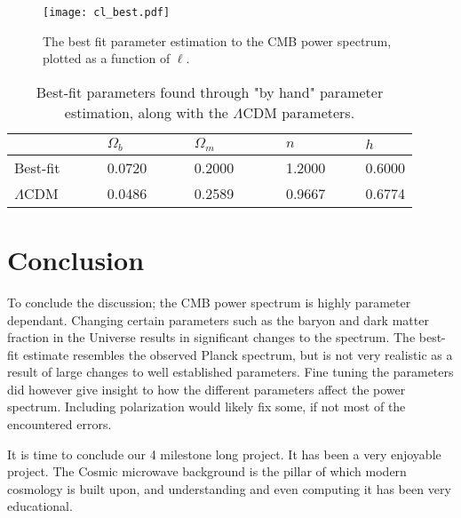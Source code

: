 \documentclass[a4paper, 10pt, reqno]{amsart}
\begin{document}
\begin{figure}
    \centering
    \texttt{[image: cl\_best.pdf]}
    \caption{The best fit parameter estimation to the CMB power spectrum, plotted as a function of $\ell$. }
    \label{fig: best}
\end{figure}

\begin{table}
\caption{Best-fit parameters found through "by hand" parameter estimation, along with the $\Lambda$CDM parameters.}
\label{tab: best}
\begin{tabular}{lllll}
\hline
\hline
&$\Omega_b \qquad\qquad$ & $\Omega_m \qquad\qquad$ & $n \qquad\qquad$ & $h$ \\ \hline
Best-fit $\qquad$&0.0720      & 0.2000        & 1.2000 & 0.6000 \\
$\Lambda$CDM $\qquad$& 0.0486 & 0.2589 & 0.9667 & 0.6774\\
\hline
\end{tabular}
\end{table}

\section{Conclusion}
To conclude the discussion; the CMB power spectrum is highly parameter dependant. Changing certain parameters such as the baryon and dark matter fraction in the Universe results in significant changes to the spectrum. The best-fit estimate resembles the observed Planck spectrum, but is not very realistic as a result of large changes to well established parameters. Fine tuning the parameters did however give insight to how the different parameters affect the power spectrum. Including polarization would likely fix some, if not most of the encountered errors.

It is time to conclude our 4 milestone long project. It has been a very enjoyable project. The Cosmic microwave background is the pillar of which modern cosmology is built upon, and understanding and even computing it has been very educational.

{}

\end{document}
